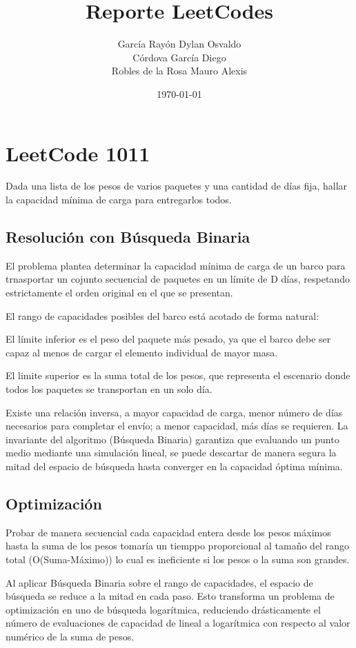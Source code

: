 \documentclass[12pt, a4paper]{article}
\title{\textbf{Reporte LeetCodes}}
\author{García Rayón Dylan Osvaldo\\
Córdova García Diego\\
Robles de la Rosa Mauro Alexis}
\date{\today}
\begin{document}
\maketitle

\section{LeetCode 1011}
Dada una lista de los pesos de varios paquetes y una cantidad de días fija, hallar la capacidad mínima de carga para entregarlos todos.

\subsection{Resolución con Búsqueda Binaria}
El problema plantea determinar la capacidad mínima de carga de un barco para trnasportar un cojunto secuencial de paquetes en un límite de D días,
respetando estrictamente el orden original en el que se presentan.

El rango de capacidades posibles del barco está acotado de forma natural:

El límite inferior es el peso del paquete más pesado, ya que el barco debe ser capaz al menos de cargar el elemento individual de mayor masa.

El limite superior es la suma total de los pesos, que representa el escenario donde todos los paquetes se transportan en un solo día.

Existe una relación inversa, a mayor capacidad de carga, menor número de días necesarios para completar el envío; a menor capacidad, más días se requieren.
La invariante del algoritmo (Búsqueda Binaria) garantiza que evaluando un punto medio mediante una simulación lineal, se puede descartar de manera segura la mitad
del espacio de búsqueda hasta converger en la capacidad óptima mínima.

\subsection{Optimización}
Probar de manera secuencial cada capacidad entera desde los pesos máximos hasta la suma de los pesos tomaría un tiemppo proporcional al tamaño del rango total (O(Suma-Máximo))
lo cual es ineficiente si los pesos o la suma son grandes.

Al aplicar Búsqueda Binaria sobre el rango de capacidades, el espacio de búsqueda se reduce a la mitad en cada paso. Esto transforma un problema de optimización en uno de búsqueda
logarítmica, reduciendo drásticamente el número de evaluaciones de capacidad de lineal a logarítmica con respecto al valor numérico de la suma de pesos.
\end{document}
